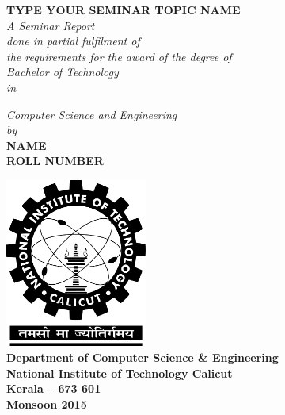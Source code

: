 \begin{titlepage}
\begin{center}

\huge \textbf {TYPE YOUR SEMINAR TOPIC NAME}\\[1.5cm]

\small
	\emph{A Seminar Report\\
	done in partial fulfilment of\\
	the requirements for the award of the degree of}\\[0.5cm]

\large \emph{Bachelor of Technology}\\
\small \emph{in}\par
\large \emph{Computer Science and Engineering}\\[0.5cm]

\Large \emph{by}\\[1cm]

\small \textbf{NAME\\
	ROLL NUMBER}

\vfill

\includegraphics[width=0.35\textwidth]{./nitc-logo.png}\\[1.5cm]
\large \textbf{Department of Computer Science \& Engineering}\\
\Large \textbf{National Institute of Technology Calicut}\\

\small \textbf{Kerala -- 673 601\\
		Monsoon 2015}

\end{center}
\end{titlepage}
